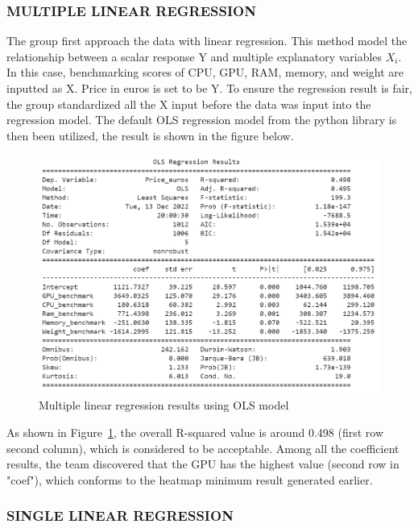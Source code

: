 \documentclass{scrartcl}
\begin{document}
\subsubsection{MULTIPLE LINEAR REGRESSION}

The group first approach the data with linear regression. This method model the relationship between a scalar response Y and multiple explanatory variables $X_i$. In this case, benchmarking scores of CPU, GPU, RAM, memory, and weight are inputted as X. Price in euros is set to be Y. To ensure the regression result is fair, the group standardized all the X input before the data was input into the regression model. The default OLS regression model from the python library\cite{chen} is then been utilized, the result is shown in the figure below.

\begin{figure}[H]
	\begin{center}
		\includegraphics[scale=0.6]{Graphics/4520 final/OLS_regression.png}
	\end{center}
	\caption{Multiple linear regression results using OLS model}
	\label{fig:OLS}
\end{figure}

\noindent As shown in Figure~\ref{fig:OLS}, the overall R-squared value is around 0.498 (first row second column), which is considered to be acceptable. Among all the coefficient results, the team discovered that the GPU has the highest value (second row in "coef"), which conforms to the heatmap minimum result generated earlier. 

\subsubsection{SINGLE LINEAR REGRESSION}
\end{document}
